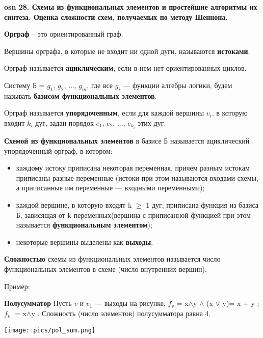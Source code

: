 \textbf{\LARGE osn 28. Схемы из функциональных элементов и простейшие алгоритмы их синтеза. Оценка сложности схем, получаемых по методу Шеннона.}

\textbf{Орграф} -- это ориентированный граф.

Вершины орграфа, в которые не входит ни одной дуги, называются \textbf{истоками}.

Орграф называется \textbf{ациклическим}, если в нем нет ориентированных циклов.

Систему Б = {$g_1$, $g_2$, ..., $g_m$}, где все $g_i$ — функции алгебры логики, будем называть \textbf{базисом функциональных элементов}.

Орграф называется \textbf{упорядоченным}, если для каждой вершины $v_i$, в которую входит $k_i$ дуг, задан порядок $e_1$, $e_2$, ..., $e_{k_i}$ этих дуг.

\bigbreak

\textbf{Схемой из функциональных элементов} в базисе Б называется ациклический упорядоченный орграф, в котором:
\begin{itemize}
    \item каждому истоку приписана некоторая переменная, причем разным истокам приписаны разные переменные (истоки при этом называются входами схемы, а приписанные им переменные — входными переменными);
    \item каждой вершине, в которую входят k $\geq$ 1 дуг, приписана функция из базиса Б, зависящая от k переменных(вершина с приписанной функцией при этом называется \textbf{функциональным элементом}); 
    \item некоторые вершины выделены как \textbf{выходы}. 
\end{itemize}

\textbf{Сложностью} схемы из функциональных элементов называется число функциональных элементов в схеме (число внутренних вершин).

Пример:

\textbf{Полусумматор} Пусть $v$ и $v_1$ — выходы на рисунке, $f_v$ = x$\wedge$y $\wedge$ (x $\vee$ y)= x + y ; $f_{v_1}$ = x$\wedge$y . Сложность (число элементов) полусумматора равна 4.

\texttt{[image: pics/pol\_sum.png]}


